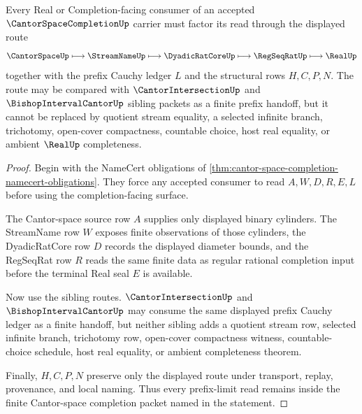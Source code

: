 \begin{theorem}
\label{thm:cantor-space-completion-prefix-limit-route}
Every Real or Completion-facing consumer of an accepted $\CantorSpaceCompletionUp$ carrier must factor its read through the displayed route
$$
\CantorSpaceUp \longmapsto \StreamNameUp \longmapsto \DyadicRatCoreUp \longmapsto \RegSeqRatUp \longmapsto \RealUp
$$
together with the prefix Cauchy ledger $L$ and the structural rows $H,C,P,N$. The route may be compared with $\CantorIntersectionUp$ and $\BishopIntervalCantorUp$ sibling packets as a finite prefix handoff, but it cannot be replaced by quotient stream equality, a selected infinite branch, trichotomy, open-cover compactness, countable choice, host real equality, or ambient $\RealUp$ completeness.
\end{theorem}
\begin{proof}
Begin with the NameCert obligations of \autoref{thm:cantor-space-completion-namecert-obligations}. They force any accepted consumer to read $A,W,D,R,E,L$ before using the completion-facing surface.

The Cantor-space source row $A$ supplies only displayed binary cylinders. The StreamName row $W$ exposes finite observations of those cylinders, the DyadicRatCore row $D$ records the displayed diameter bounds, and the RegSeqRat row $R$ reads the same finite data as regular rational completion input before the terminal Real seal $E$ is available.

Now use the sibling routes. $\CantorIntersectionUp$ and $\BishopIntervalCantorUp$ may consume the same displayed prefix Cauchy ledger as a finite handoff, but neither sibling adds a quotient stream row, selected infinite branch, trichotomy row, open-cover compactness witness, countable-choice schedule, host real equality, or ambient completeness theorem.

Finally, $H,C,P,N$ preserve only the displayed route under transport, replay, provenance, and local naming. Thus every prefix-limit read remains inside the finite Cantor-space completion packet named in the statement.
\end{proof}


